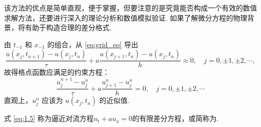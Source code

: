 \begin{note}
    该方法的优点是简单直观，便于掌握，但要注意的是究竟能否构成一个有效的数值求解方法，还要进行深入的理论分析和数值模拟验证. 如果了解微分方程的物理背景，将有助于构造合理的差分格式.
\end{note}

\begin{instance}[]
    由 $t_{-1}$ 和 $x_{-1}$ 的组合，从 \eqref{eq:grid_eq} 导出
    \[ \frac{u(x_j, t_{n+1}) - u(x_j, t_n)}{\tau} + a \frac{u(x_{j+1}, t_n) - u(x_j, t_n)}{h} \approx 0, \quad j = 0, \pm 1, \pm 2, \cdots, \]
    故得格点函数应满足的约束方程：
    \begin{equation}
        \frac{u_j^{n+1} - u_j^n}{\tau} + a \frac{u_{j+1}^n - u_j^n}{h} = 0, \quad j = 0, \pm 1, \pm 2, \cdots \label{eq:1.5}
    \end{equation}
    直观上，$u_j^n$ 应该为 $u(x_j, t_n)$ 的近似值.
\end{instance}

式 \eqref{eq:1.5} 称为逼近对流方程$u_t + a u_x = 0$的有限差分方程，或简称为.


